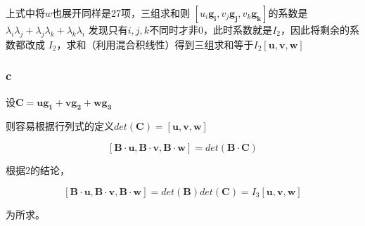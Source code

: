 \documentclass[UTF8,zihao=5]{ctexart}
\begin{document}
上式中将$w$也展开同样是27项，三组求和则
$[u_i\bm{g_i},v_j\bm{g_j},v_k\bm{g_k}]$的系数是
$\lambda_i\lambda_j+\lambda_j\lambda_k+\lambda_k\lambda_i$
发现只有$i,j,k$不同时才非0，此时系数就是$I_2$，因此将剩余的系数都改成
$I_2$，求和（利用混合积线性）得到三组求和等于$I_2[\bm{u},\bm{v},\bm{w}]$

\subsubsection*{c}

设$\bm{C} = \bm{u}\bm{g_1}+\bm{v}\bm{g_2}+\bm{w}\bm{g_3}$

则容易根据行列式的定义$det(\bm{C})=\bm{[u,v,w]}$

$$
\bm{[B\cdot \bm{u},B\cdot \bm{v},B\cdot \bm{w}]}=det(\bm{B}\cdot \bm{C})
$$

根据2的结论，

$$
\bm{[B\cdot \bm{u},B\cdot \bm{v},B\cdot \bm{w}]}=det(\bm{B})det(\bm{C})
=I_3\bm{[u,v,w]}
$$

为所求。
\end{document}
